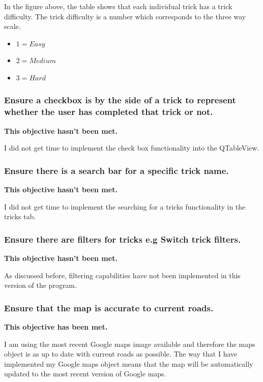 In the figure above, the table shows that each individual trick has a trick difficulty. The trick difficulty is a number which corresponds to the three way scale.

\begin{itemize}
\item $1 = Easy$
\item $2 = Medium$
\item $3 = Hard$
\end{itemize}


\subsubsection {Ensure a checkbox is by the side of a trick to represent whether the user has completed that trick or not.}

\textbf{This objective hasn't been met.}

I did not get time to implement the check box functionality into the QTableView.

\subsubsection {Ensure there is a search bar for a specific trick name.}

\textbf{This objective hasn't been met.}

I did not get time to implement the searching for a tricks functionality in the tricks tab.

\subsubsection {Ensure there are filters for tricks e.g Switch trick filters.}

\textbf{This objective hasn't been met.}

As discussed before, filtering capabilities have not been implemented in this version of the program.




\subsubsection {Ensure that the map is accurate to current roads.}

\textbf{This objective has been met.}

I am using the most recent Google maps image available and therefore the maps object is as up to date with current roads as possible. The way that I have implemented my Google maps object means that the map will be automatically updated to the most recent version of Google maps.

